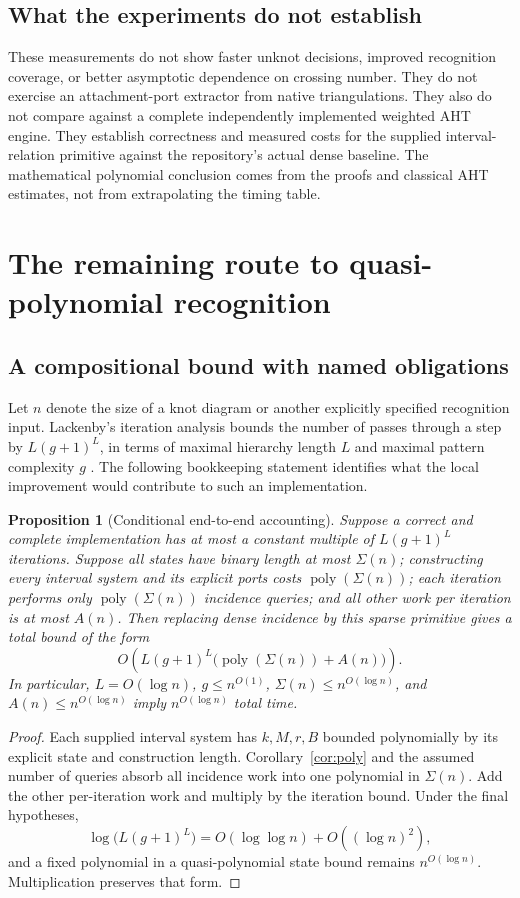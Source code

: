 \documentclass[11pt,letterpaper]{article}
\newtheorem{proposition}[theorem]{Proposition}
\theoremstyle{definition}
\newcommand{\poly}{\operatorname{poly}}
\begin{document}
\subsection{What the experiments do not establish}
These measurements do not show faster unknot decisions, improved recognition
coverage, or better asymptotic dependence on crossing number. They do not
exercise an attachment-port extractor from native triangulations. They also
do not compare against a complete independently implemented weighted AHT
engine. They establish correctness and measured costs for the supplied
interval-relation primitive against the repository's actual dense baseline.
The mathematical polynomial conclusion comes from the proofs and classical
AHT estimates, not from extrapolating the timing table.

\section{The remaining route to quasi-polynomial recognition}\label{sec:global}

\subsection{A compositional bound with named obligations}
Let $n$ denote the size of a knot diagram or another explicitly specified
recognition input. Lackenby's iteration analysis bounds the number of
passes through a step by $L(g+1)^L$, in terms of maximal hierarchy length
$L$ and maximal pattern complexity $g$ \cite[Proposition~9.1]{lackenby}.
The following bookkeeping statement identifies what the local improvement
would contribute to such an implementation.

\begin{proposition}[Conditional end-to-end accounting]\label{prop:global}
Suppose a correct and complete implementation has at most a constant
multiple of $L(g+1)^L$ iterations. Suppose all states have binary length at
most $\Sigma(n)$; constructing every interval system and its explicit ports
costs $\poly(\Sigma(n))$; each iteration performs only
$\poly(\Sigma(n))$ incidence queries; and all other work per iteration is
at most $A(n)$. Then replacing dense incidence by this sparse primitive
gives a total bound of the form
\begin{equation}\label{eq:global}
 O\!\left(L(g+1)^L
       \bigl(\poly(\Sigma(n))+A(n)\bigr)\right).
\end{equation}
In particular, $L=O(\log n)$, $g\le n^{O(1)}$,
$\Sigma(n)\le n^{O(\log n)}$, and $A(n)\le n^{O(\log n)}$ imply
$n^{O(\log n)}$ total time.
\end{proposition}
\begin{proof}
Each supplied interval system has $k,M,r,B$ bounded polynomially by its
explicit state and construction length. Corollary~\ref{cor:poly} and the
assumed number of queries absorb all incidence work into one polynomial
in $\Sigma(n)$. Add the other per-iteration work and multiply by the
iteration bound. Under the final hypotheses,
\[
 \log\bigl(L(g+1)^L\bigr)=O(\log\log n)+O((\log n)^2),
\]
and a fixed polynomial in a quasi-polynomial state bound remains
$n^{O(\log n)}$. Multiplication preserves that form.
\end{proof}
\end{document}
